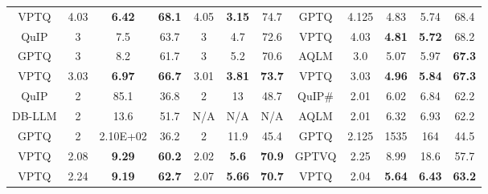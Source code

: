 \begin{table}[hbt!]
{\begin{tabular}{c|ccc|ccc|c|cccc}
VPTQ              & 4.03                 & \textbf{6.42}        & \textbf{68.1}           & 4.05                 & \textbf{3.15}        & 74.7                    & GPTQ              & 4.125                & 4.83                 & 5.74                 & 68.4                    \\ \cline{1-7}
QuIP              & 3                    & 7.5                  & 63.7                    & 3                    & 4.7                  & 72.6                    & VPTQ              & 4.03                 & \textbf{4.81}        & \textbf{5.72}        & 68.2                    \\ \cline{8-12} 
GPTQ              & 3                    & 8.2                  & 61.7                    & 3                    & 5.2                  & 70.6                    & AQLM              & 3.0                  & 5.07                 & 5.97                 & \textbf{67.3}           \\
VPTQ              & 3.03                 & \textbf{6.97}        & \textbf{66.7}           & 3.01                 & \textbf{3.81}        & \textbf{73.7}           & VPTQ              & 3.03                 & \textbf{4.96}        & \textbf{5.84}        & \textbf{67.3}           \\ \hline
QuIP              & 2                    & 85.1                 & 36.8                    & 2                    & 13                   & 48.7                    & QuIP\#            & 2.01                 & 6.02                 & 6.84                 & 62.2                    \\
DB-LLM            & 2                    & 13.6                 & 51.7                    & N/A                  & N/A                  & N/A                     & AQLM              & 2.01                 & 6.32                 & 6.93                 & 62.2                    \\
GPTQ              & 2                    & 2.10E+02             & 36.2                    & 2                    & 11.9                 & 45.4                    & GPTQ              & 2.125                & 1535                 & 164                  & 44.5                    \\
VPTQ              & 2.08                 & \textbf{9.29}        & \textbf{60.2}           & 2.02                 & \textbf{5.6}         & \textbf{70.9}           & GPTVQ             & 2.25                 & 8.99                 & 18.6                 & 57.7                    \\
VPTQ              & 2.24                 & \textbf{9.19}        & \textbf{62.7}           & 2.07                 & \textbf{5.66}        & \textbf{70.7}           & VPTQ              & 2.04                 & \textbf{5.64}        & \textbf{6.43}        & \textbf{63.2}           \\ \hline
\end{tabular}
}
\vspace{-0.2in}
\end{table}